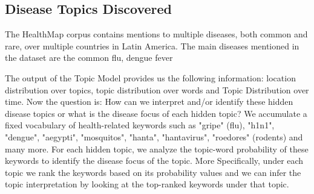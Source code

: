 \documentclass[conference]{IEEEtran}
\begin{document}
\subsection{Disease Topics Discovered}
The HealthMap corpus contains mentions to multiple diseases, both common and rare, over multiple countries in Latin America. The main diseases mentioned in the dataset are the common flu, dengue fever 

The output of the Topic Model provides us the following information: location 
distribution over topics, topic distribution over words and Topic Distribution 
over time. Now the question is: How can we interpret and/or identify these hidden 
disease topics or what is the disease focus of each hidden topic? We accumulate a fixed 
vocabulary of health-related keywords such as "gripe" (flu), "h1n1", "dengue", "aegypti", "mosquitos",
"hanta", "hantavirus", "roedores" (rodents) and many more. For each hidden topic, 
we analyze the topic-word probability of these keywords to identify the disease
focus of the topic. More Specifically, under each topic we rank the keywords 
based on its probability values and we can infer the topic interpretation by 
looking at the top-ranked keywords under that topic. 
\end{document}
